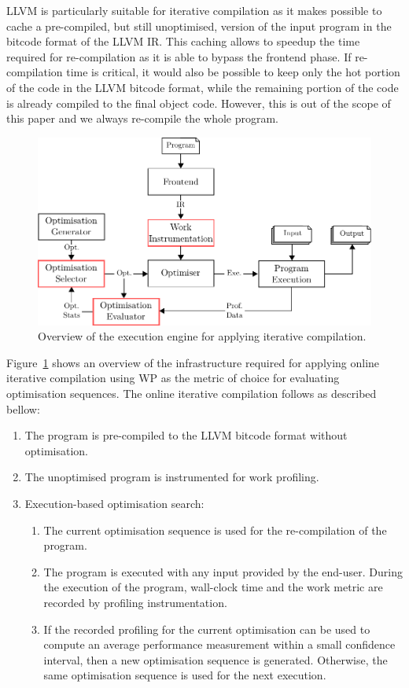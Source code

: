 \documentclass[sigplan,10pt]{acmart}
\theoremstyle{definition}
\newcommand{\itercomp}{{iterative compilation}}
\begin{document}
LLVM is particularly suitable for iterative compilation as it makes possible to cache a pre-compiled, but still unoptimised, version of the input program in the bitcode format of the LLVM IR.
This caching allows to speedup the time required for re-compilation as it is able to bypass the frontend phase.
If re-compilation time is critical, it would also be possible to keep only the hot portion of the code in the LLVM bitcode format, while the remaining portion of the code is already compiled to the final object code.
However, this is out of the scope of this paper and we always re-compile the whole program.

\begin{figure}[htb]
    \centering
    \includegraphics[width=\linewidth]{figs/infra-diagram}
    \caption{Overview of the execution engine for applying {\itercomp}.}
    \label{fig:infra-diagram}
\end{figure}

Figure~\ref{fig:infra-diagram} shows an overview of the infrastructure required for applying online {\itercomp}
using WP as the metric of choice for evaluating optimisation sequences.
The online {\itercomp} follows as described bellow:
\begin{enumerate}
\item The program is pre-compiled to the LLVM bitcode format without optimisation.
\item The unoptimised program is instrumented for work profiling.
\item Execution-based optimisation search:
 \begin{enumerate}
   \item The current optimisation sequence is used for the re-compilation of the program.
   \item The program is executed with any input provided by the end-user.
         During the execution of the program, wall-clock time and the work metric are recorded by profiling instrumentation.
   \item If the recorded profiling for the current optimisation can be used to compute an average performance measurement within a small confidence interval,
         then a new optimisation sequence is generated.
         Otherwise, the same optimisation sequence is used for the next execution.
 \end{enumerate}
\end{enumerate}
\end{document}
